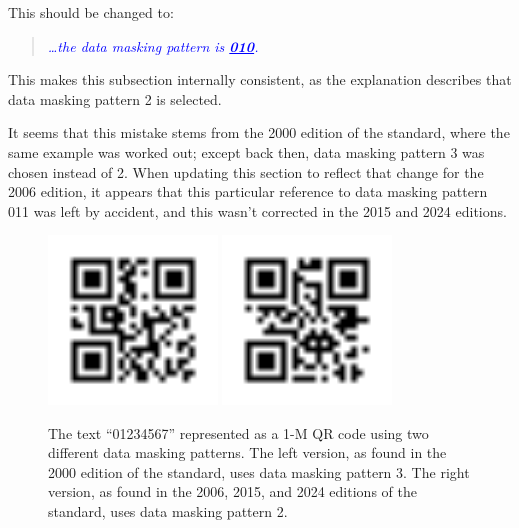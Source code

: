 \documentclass[a4paper,twoside]{article}
\newcommand{\quotestandard}[1]{\textcolor{blue}{\textit{#1}}}
\newcommand{\ddd}{\dots}
\newcommand{\change}[1]{\underline{\textbf{#1}}}
\begin{document}
This should be changed to:

\begin{quote}
\quotestandard{\ddd the data masking pattern is \change{010}.}
\end{quote}

This makes this subsection internally consistent, as the explanation describes that data masking pattern 2 is selected.

It seems that this mistake stems from the 2000 edition of the standard, where the same example was
worked out; except back then, data masking pattern 3 was chosen instead of 2.  When updating this
section to reflect that change for the 2006 edition, it appears that this particular  reference to
data masking pattern 011 was left by accident, and this wasn't corrected in the 2015 and 2024 editions.

\begin{figure}[h]
\centering
\includegraphics[width=0.4\textwidth]{images/qrcode_iso18004_2000_AnnexG_1Mp3.png}
\includegraphics[width=0.4\textwidth]{images/qrcode_iso18004_2006_2015_2024_AnnexI_1Mp2.png}
\caption{The text ``01234567'' represented as a 1-M QR code using two different data masking patterns.
         The left version, as found in the 2000 edition of the standard, uses data masking pattern 3.
         The right version, as found in the 2006, 2015, and 2024 editions of the standard, uses data masking pattern 2.}
\end{figure}
\end{document}
